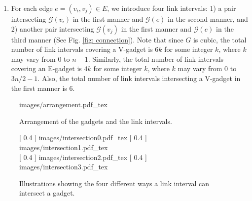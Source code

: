 \documentclass[11pt]{article}
\begin{document}
\begin{enumerate}
 \item For each edge $e = (v_i, v_j) \in E$, we introduce four link intervals: 1) a pair intersecting $\mathcal{G}(v_i)$ in the first manner and $\mathcal{G}(e)$ in the second manner, and 2) another pair intersecting $\mathcal{G}(v_j)$ in the first manner and $\mathcal{G}(e)$ in the third manner  (See Fig. \ref{fig: connection}). Note that since $G$ is cubic, the total number of link intervals covering a V-gadget is $6k$ for some integer $k$, where $k$ may vary from $0$ to $n-1$. Similarly, the total number of link intervals covering an E-gadget is $4k$ for some integer $k$, where $k$ may vary from $0$ to $3n/2-1$. Also, the total number of link intervals intersecting a V-gadget in the first manner is $6$.
 \end{enumerate}
 
 
 
 

\begin{figure}[h!]
\centering

{
    \fontsize{8pt}{8pt}\selectfont%
    \def\svgwidth{1\textwidth}
    {images/arrangement.pdf_tex}
}


\caption[Short Caption]{Arrangement of the gadgets and the link intervals.}
\label{fig: arrangement}
\end{figure}
 

   \begin{figure}[h!]
\centering
{}
[
    0.4\textwidth %
]
{
    \fontsize{8pt}{8pt}\selectfont%
    \def\svgwidth{0.4\textwidth}
    {images/intersection0.pdf_tex}
}
\hfill %
[
    0.4\textwidth %
]
{
    \fontsize{8pt}{8pt}\selectfont
    \def\svgwidth{0.4\textwidth}
    {images/intersection1.pdf_tex}
}
\\
[
    0.4\textwidth %
]
{
    \fontsize{8pt}{8pt}\selectfont%
    \def\svgwidth{0.4\textwidth}
    {images/intersection2.pdf_tex}
}
\hfill
{}
[
    0.4\textwidth %
]
{
    \fontsize{8pt}{8pt}\selectfont%
    \def\svgwidth{0.4\textwidth}
    {images/intersection3.pdf_tex}
}



\caption[Short Caption]{Illustrations showing the four different ways a link interval can intersect a gadget. }
\label{notcollision}
\end{figure}
  
\end{document}
